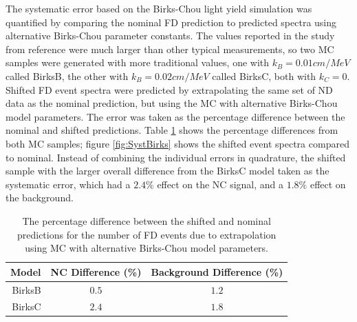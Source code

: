 The systematic error based on the Birks-Chou light yield simulation was quantified by comparing the nominal FD prediction to predicted spectra using alternative Birks-Chou parameter constants. The values reported in the study from reference \cite{ref:DanBirks} were much larger than other typical measurements, so two MC samples were generated with more traditional values, one with $k_B = 0.01\unit{cm/MeV}$ called BirksB, the other with $k_B = 0.02\unit{cm/MeV}$ called BirksC, both with $k_C = 0$. Shifted FD event spectra were predicted by extrapolating the same set of ND data as the nominal prediction, but using the MC with alternative Birks-Chou model parameters. The error was taken as the percentage difference between the nominal and shifted predictions. Table \ref{tab:SystBirks} shows the percentage differences from both MC samples; figure \ref{fig:SystBirks} shows the shifted event spectra compared to nominal. Instead of combining the individual errors in quadrature, the shifted sample with the larger overall difference from the BirksC model taken as the systematic error, which had a $2.4\%$ effect on the NC signal, and a $1.8\%$ effect on the background.
\begin{table}[htb]
  \begin{center}
    \caption[Birks-Chou Systematic Errors]{The percentage difference between the shifted and nominal predictions for the number of FD events due to extrapolation using MC with alternative Birks-Chou model parameters.}
    \label{tab:SystBirks}
    \begin{tabular}{r c c}
      \hline\hline
      Model & NC Difference (\%) & Background Difference (\%) \\
      \hline
      BirksB & $0.5$ & $1.2$ \\
      BirksC & $2.4$ & $1.8$ \\
      \hline
    \end{tabular}
  \end{center}
\end{table}

